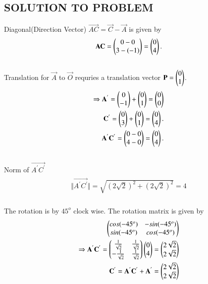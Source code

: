 \documentclass[journal,12pt,twocolumn]{IEEEtran}
\begin{document}
\subsection{SOLUTION TO PROBLEM}
Diagonal(Direction Vector) $\vec{AC} = \vec{C}-\vec{A} $  is given by
\begin{align}
\begin{split}
\mathbf{AC} = \begin{pmatrix}0 - 0\\3 - (-1)\end{pmatrix} = \begin{pmatrix}0\\4\end{pmatrix}.\\
\end{split}
\end{align}
\\
Translation for $\vec{A}$ to $\vec{O}$ requries a translation vector $ \mathbf{P}=\begin{pmatrix}0\\1\end{pmatrix}$.
\begin{align}
\begin{split}
\Rightarrow
\mathbf{A^{'}} = \begin{pmatrix}0 \\ -1\end{pmatrix}  + \begin{pmatrix}0\\1\end{pmatrix} = \begin{pmatrix}0\\0\end{pmatrix} &\\
\mathbf{C^{'}} = \begin{pmatrix}0 \\ 3\end{pmatrix} + \begin{pmatrix}0\\1\end{pmatrix} = \begin{pmatrix}0\\4\end{pmatrix}.\\
\mathbf{A^{'}C^{'}} = \begin{pmatrix}0 - 0\\4- 0\end{pmatrix} = \begin{pmatrix}0\\4\end{pmatrix}.\\
\end{split}
\end{align}
\\
Norm of $\vec{A^{'}C^{'}}$
\begin{align}
\begin{split}
\Vert\vec{A^{'}C^{'}}\Vert = \sqrt{(2\sqrt{2})^{2}+(2\sqrt{2})^{2}} = 4
\end{split}
\end{align}
\\
The rotation is by $45^{o}$ clock wise. The rotation matrix is given by 
\begin{align}
\begin{split}
\begin{pmatrix}cos(-45^{o}) & -sin(-45^{o})\\sin(-45^{o}) & cos(-45^{o})\end{pmatrix}\\ 
\Rightarrow \mathbf{A^{'}C^{'}} =   \begin{pmatrix}\frac{1}{\sqrt{2}} & \frac{1}{\sqrt{2}} \\ -\frac{1}{\sqrt{2}} & \frac{1}{\sqrt{2}}\end{pmatrix} \begin{pmatrix}0 \\ 4\end{pmatrix}= \begin{pmatrix}2\sqrt{2}\\2\sqrt{2}\end{pmatrix}\\
\mathbf{C^{'}}=\mathbf{A^{'}C^{'}}+\mathbf{A^{'}}=\begin{pmatrix}2\sqrt{2}\\2\sqrt{2}\end{pmatrix}\\
\end{split}
\end{align}
\end{document}
